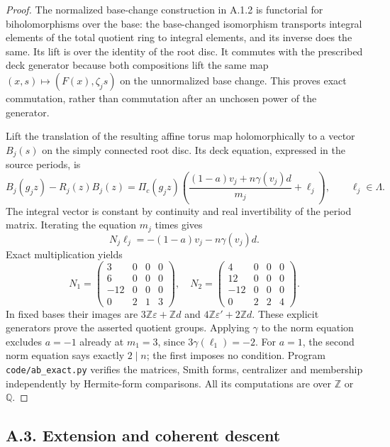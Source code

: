 \begin{proof}
The normalized base-change construction in A.1.2 is functorial for biholomorphisms over the base: the base-changed isomorphism transports integral elements of the total quotient ring to integral elements, and its inverse does the same. Its lift is over the identity of the root disc. It commutes with the prescribed deck generator because both compositions lift the same map $(x,s)\mapsto(F(x),\zeta_js)$ on the unnormalized base change. This proves exact commutation, rather than commutation after an unchosen power of the generator.

Lift the translation of the resulting affine torus map holomorphically to a vector $B_j(s)$ on the simply connected root disc. Its deck equation, expressed in the source periods, is
\[
 B_j(g_jz)-R_j(z)B_j(z)=\Pi_c(g_jz)
 \left(\frac{(1-a)v_j+n\gamma(v_j)d}{m_j}+\ell_j\right),\qquad\ell_j\in\Lambda.
\]
The integral vector is constant by continuity and real invertibility of the period matrix. Iterating the equation $m_j$ times gives
\[
 N_j\ell_j=-(1-a)v_j-n\gamma(v_j)d.
\]
Exact multiplication yields
\[
 N_1=\begin{pmatrix}3&0&0&0\\6&0&0&0\\-12&0&0&0\\0&2&1&3\end{pmatrix},\quad
 N_2=\begin{pmatrix}4&0&0&0\\12&0&0&0\\-12&0&0&0\\0&2&2&4\end{pmatrix}.
\]
In fixed bases their images are $3\mathbb Z\varepsilon+\mathbb Zd$ and $4\mathbb Z\varepsilon'+2\mathbb Zd$. These explicit generators prove the asserted quotient groups. Applying $\gamma$ to the norm equation excludes $a=-1$ already at $m_1=3$, since $3\gamma(\ell_1)=-2$. For $a=1$, the second norm equation says exactly $2\mid n$; the first imposes no condition. Program \texttt{code/ab\_exact.py} verifies the matrices, Smith forms, centralizer and membership independently by Hermite-form comparisons. All its computations are over $\mathbb Z$ or $\mathbb Q$.
\end{proof}

\subsection{A.3. Extension and coherent descent}

